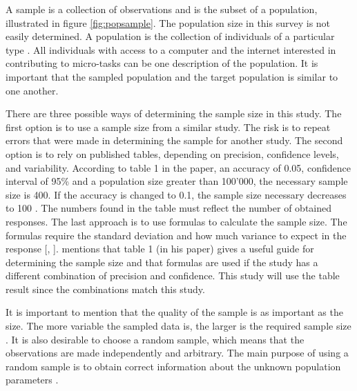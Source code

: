 A sample is a collection of observations and is the subset of a population, illustrated in figure \ref{fig:popsample}. The population size in this survey is not easily determined. A population is the collection of individuals of a particular type \citep{Walpole2012}. All individuals with access to a computer and the internet interested in contributing to micro-tasks can be one description of the population. It is important that the sampled population and the target population is similar to one another.

There are three possible ways of determining the sample size in this study. The first option is to use a sample size from a similar study. The risk is to repeat errors that were made in determining the sample for another study. The second option is to rely on published tables, depending on precision, confidence levels, and variability. According to table 1 in the \cite{Israel1992} paper, an accuracy of 0.05, confidence interval of 95\% and a population size greater than 100'000, the necessary sample size is 400. If the accuracy is changed to 0.1, the sample size necessary decreases to 100 \citep{Israel1992}. The numbers found in the table must reflect the number of obtained responses. The last approach is to use formulas to calculate the sample size. The formulas require the standard deviation and how much variance to expect in the response [\citep{Israel1992}, \citep{Smith2013}]. \cite{Israel1992} mentions that table 1 (in his paper) gives a useful guide for determining the sample size and that formulas are used if the study has a different combination of precision and confidence. This study will use the table result since the combinations match this study.

It is important to mention that the quality of the sample is as important as the size. The more variable the sampled data is, the larger is the required sample size \citep{Israel1992}. It is also desirable to choose a random sample, which means that the observations are made independently and arbitrary. The main purpose of using a random sample is to obtain correct information about the unknown population parameters \citep{Walpole2012}. 




